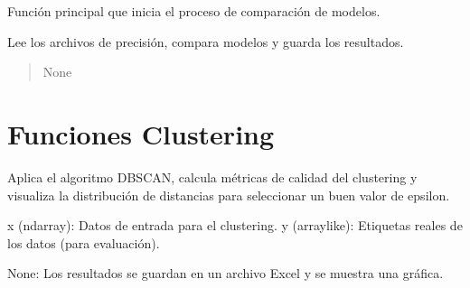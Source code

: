 \documentclass[letterpaper,10pt,spanish]{sphinxmanual}
\begin{document}

\begin{fulllineitems}
\label{\detokenize{Funciones_Generales:comparacion_n_covariables.inicio_comp}}
\pysigstartsignatures
\pysiglinewithargsret
{}
{\sphinxparamcomma {}\sphinxparamcomma {}\sphinxparamcomma {}\sphinxparamcomma {}\sphinxparamcomma {}\sphinxparamcomma {}\sphinxparamcomma {}}
{}
\pysigstopsignatures
\sphinxAtStartPar
Función principal que inicia el proceso de comparación de modelos.

\sphinxAtStartPar
Lee los archivos de precisión, compara modelos y guarda los resultados.
\begin{quote}\begin{description}
\sphinxAtStartPar
None

\end{description}\end{quote}

\end{fulllineitems}


\sphinxstepscope


\chapter{Funciones Clustering}
\label{\detokenize{Clustering:module-clustering}}\label{\detokenize{Clustering:funciones-clustering}}\label{\detokenize{Clustering::doc}}

\begin{fulllineitems}
\label{\detokenize{Clustering:clustering.dbscan}}
\pysigstartsignatures
\pysiglinewithargsret
{}
{\sphinxparamcomma {}}
{}
\pysigstopsignatures
\sphinxAtStartPar
Aplica el algoritmo DBSCAN, calcula métricas 
de calidad del clustering y visualiza la distribución de distancias para 
seleccionar un buen valor de epsilon.
\begin{description}
\sphinxAtStartPar
x (ndarray): Datos de entrada para el clustering.
y (array\sphinxhyphen{}like): Etiquetas reales de los datos (para evaluación).

\sphinxAtStartPar
None: Los resultados se guardan en un archivo Excel y se muestra una gráfica.

\end{description}

\end{fulllineitems}
\end{document}
